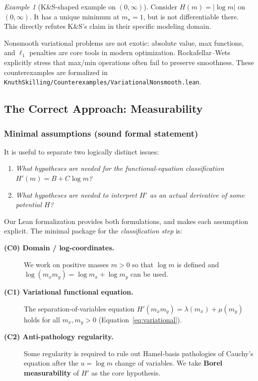 \documentclass[11pt]{article}
\theoremstyle{definition}
\theoremstyle{remark}
\newtheorem{example}[theorem]{Example}
\begin{document}
\begin{example}[K\&S-shaped example on $(0,\infty)$]
Consider $H(m) = |\log m|$ on $(0, \infty)$.
It has a unique minimum at $m_\star = 1$, but is not differentiable there.
This directly refutes K\&S's claim in their specific modeling domain.
\end{example}

Nonsmooth variational problems are not exotic: absolute value, max functions, and $\ell_1$ penalties are core tools in modern optimization.
Rockafellar--Wets~\cite{RockafellarWets} explicitly stress that max/min operations often fail to preserve smoothness.
These counterexamples are formalized in \texttt{KnuthSkilling/Counterexamples/VariationalNonsmooth.lean}.

\subsection{The Correct Approach: Measurability}

\subsubsection{Minimal assumptions (sound formal statement)}

It is useful to separate two logically distinct issues:
\begin{enumerate}
\item \emph{What hypotheses are needed for the functional-equation \emph{classification} $H'(m)=B+C\log m$?}
\item \emph{What hypotheses are needed to interpret $H'$ as an actual derivative of some potential $H$?}
\end{enumerate}

Our Lean formalization provides both formulations, and makes each assumption explicit.
The minimal package for the \emph{classification step} is:
\begin{description}
\item[\textbf{(C0) Domain / log-coordinates.}] We work on positive masses $m>0$ so that $\log m$ is defined and
  $\log(m_x m_y)=\log m_x+\log m_y$ can be used.
\item[\textbf{(C1) Variational functional equation.}] The separation-of-variables equation
  $H'(m_x m_y)=\lambda(m_x)+\mu(m_y)$ holds for all $m_x,m_y>0$ (Equation~\eqref{eq:variational}).
\item[\textbf{(C2) Anti-pathology regularity.}] Some regularity is required to rule out Hamel-basis pathologies of
  Cauchy's equation after the $u=\log m$ change of variables.  We take \textbf{Borel measurability} of $H'$ as the
  core hypothesis.
\end{description}
\end{document}
